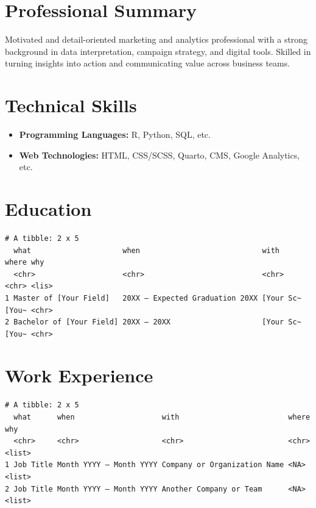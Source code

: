 \documentclass[
]{article}
\author{}
\date{\vspace{-2.5em}July 2026}
\providecommand{\tightlist}{%
  \setlength{\itemsep}{0pt}\setlength{\parskip}{0pt}}
\begin{document}
\section{Professional Summary}\label{professional-summary}

Motivated and detail-oriented marketing and analytics professional with
a strong background in data interpretation, campaign strategy, and
digital tools. Skilled in turning insights into action and communicating
value across business teams.

\section{Technical Skills}\label{technical-skills}

\begin{itemize}
\tightlist
\item
  \textbf{Programming Languages:} R, Python, SQL, etc.\\
\item
  \textbf{Web Technologies:} HTML, CSS/SCSS, Quarto, CMS, Google
  Analytics, etc.
\end{itemize}

\section{Education}\label{education}

\begin{verbatim}
# A tibble: 2 x 5
  what                     when                            with      where why  
  <chr>                    <chr>                           <chr>     <chr> <lis>
1 Master of [Your Field]   20XX – Expected Graduation 20XX [Your Sc~ [You~ <chr>
2 Bachelor of [Your Field] 20XX – 20XX                     [Your Sc~ [You~ <chr>
\end{verbatim}

\section{Work Experience}\label{work-experience}

\begin{verbatim}
# A tibble: 2 x 5
  what      when                    with                         where why   
  <chr>     <chr>                   <chr>                        <chr> <list>
1 Job Title Month YYYY – Month YYYY Company or Organization Name <NA>  <list>
2 Job Title Month YYYY – Month YYYY Another Company or Team      <NA>  <list>
\end{verbatim}
\end{document}
